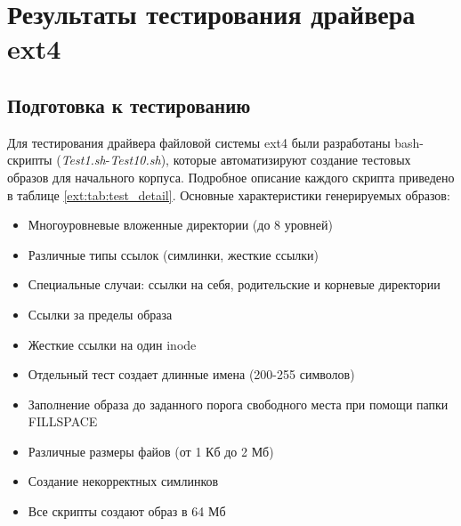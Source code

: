 \section{Результаты тестирования драйвера ext4}

\subsection{Подготовка к тестированию}
Для тестирования драйвера файловой системы ext4 были разработаны bash-скрипты (\textit{Test1.sh}-\textit{Test10.sh}), которые автоматизируют создание тестовых образов для начального корпуса. Подробное описание каждого скрипта приведено в таблице \ref{ext:tab:test_detail}. Основные характеристики генерируемых образов:
\begin{itemize}
	\item Многоуровневые вложенные директории (до 8 уровней)
	\item Различные типы ссылок (симлинки, жесткие ссылки)
	\item Специальные случаи: ссылки на себя, родительские и корневые директории
	\item Ссылки за пределы образа
	\item Жесткие ссылки на один inode
	\item Отдельный тест создает длинные имена (200-255 символов)
	\item Заполнение образа до заданного порога свободного места при помощи папки FILLSPACE
	\item Различные размеры файов (от 1 Кб до 2 Мб) 
	\item Создание некорректных симлинков
	\item Все скрипты создают образ в 64 Мб
\end{itemize} 
